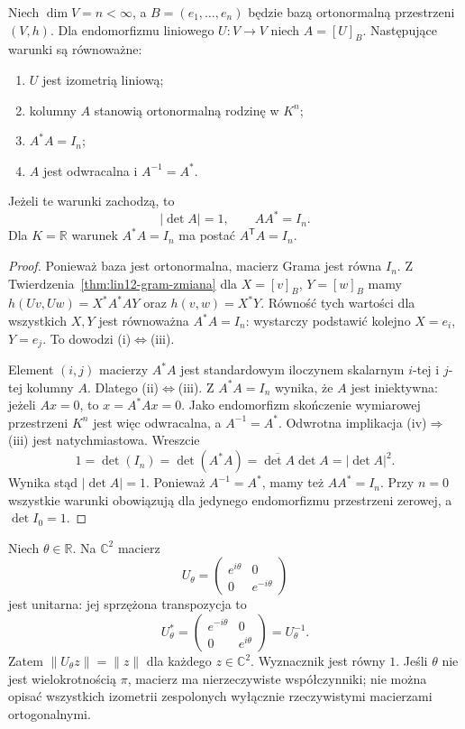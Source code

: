 \begin{twierdzenie}
\label{thm:lin12-macierz-unitarna}
Niech \(\dim V=n<\infty\),
a \(B=(e_1,\ldots,e_n)\)
będzie bazą ortonormalną
przestrzeni \((V,h)\).
Dla endomorfizmu liniowego
\(U\colon V\to V\)
niech \(A=[U]_B\).
Następujące warunki są równoważne:
\begin{enumerate}[label=(\roman*)]
 \item \(U\) jest izometrią liniową;
 \item kolumny \(A\) stanowią
       ortonormalną rodzinę w \(K^n\);
 \item \(A^*A=I_n\);
 \item \(A\) jest odwracalna
       i \(A^{-1}=A^*\).
\end{enumerate}
Jeżeli te warunki zachodzą, to
\[
 |\det A|=1,\qquad
 AA^*=I_n.
\]
Dla \(K=\mathbb R\) warunek
\(A^*A=I_n\) ma postać
\(A^{\mathsf T}A=I_n\).
\end{twierdzenie}
\begin{proof}
Ponieważ baza jest ortonormalna,
macierz Grama jest równa \(I_n\).
Z
Twierdzenia~\ref{thm:lin12-gram-zmiana}
dla \(X=[v]_B\), \(Y=[w]_B\) mamy
\(h(Uv,Uw)=X^*A^*AY\)
oraz \(h(v,w)=X^*Y\).
Równość tych wartości
dla wszystkich \(X,Y\)
jest równoważna \(A^*A=I_n\):
wystarczy podstawić
kolejno \(X=e_i\), \(Y=e_j\).
To dowodzi (i)\(\iff\)(iii).

Element \((i,j)\) macierzy
\(A^*A\) jest standardowym
iloczynem skalarnym
\(i\)-tej i \(j\)-tej
kolumny \(A\).
Dlatego (ii)\(\iff\)(iii).
Z \(A^*A=I_n\) wynika,
że \(A\) jest iniektywna:
jeżeli \(Ax=0\), to
\(x=A^*Ax=0\).
Jako endomorfizm
skończenie wymiarowej
przestrzeni \(K^n\)
jest więc odwracalna,
a \(A^{-1}=A^*\).
Odwrotna implikacja
(iv)\(\Rightarrow\)(iii)
jest natychmiastowa.
Wreszcie
\[
 1=\det(I_n)=\det(A^*A)
  =\overline{\det A}\det A
  =|\det A|^2.
\]
Wynika stąd \(|\det A|=1\).
Ponieważ \(A^{-1}=A^*\),
mamy też \(AA^*=I_n\).
Przy \(n=0\) wszystkie
warunki obowiązują
dla jedynego endomorfizmu
przestrzeni zerowej,
a \(\det I_0=1\).
\end{proof}

\begin{przyklad}
\label{prz:lin12-unitarna-fazy}
Niech \(\theta\in\mathbb R\).
Na \(\mathbb C^2\) macierz
\[
 U_\theta=\begin{pmatrix}
 e^{i\theta}&0\\
 0&e^{-i\theta}
 \end{pmatrix}
\]
jest unitarna: jej sprzężona
transpozycja to
\[
 U_\theta^*=
 \begin{pmatrix}e^{-i\theta}&0\\
                 0&e^{i\theta}\end{pmatrix}
 =U_\theta^{-1}.
\]
Zatem
\(\|U_\theta z\|=\|z\|\)
dla każdego \(z\in\mathbb C^2\).
Wyznacznik jest równy \(1\).
Jeśli \(\theta\) nie jest
wielokrotnością \(\pi\),
macierz ma nierzeczywiste
współczynniki; nie można
opisać wszystkich izometrii
zespolonych wyłącznie
rzeczywistymi macierzami
ortogonalnymi.
\end{przyklad}

